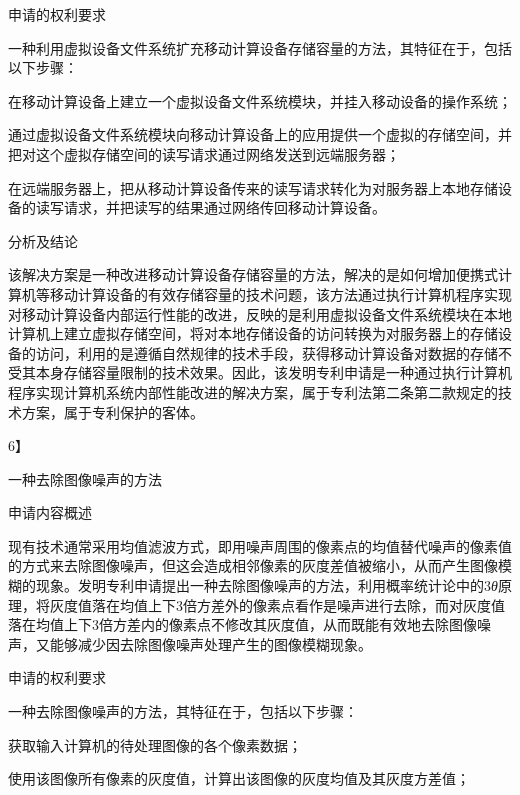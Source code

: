 {\setlength{\parindent}{22.5bp}申请的权利要求\par}

一种利用虚拟设备文件系统扩充移动计算设备存储容量的方法，其特征在于，包括以下步骤：

在移动计算设备上建立一个虚拟设备文件系统模块，并挂入移动设备的操作系统；

通过虚拟设备文件系统模块向移动计算设备上的应用提供一个虚拟的存储空间，并把对这个虚拟存储空间的读写请求通过网络发送到远端服务器；

在远端服务器上，把从移动计算设备传来的读写请求转化为对服务器上本地存储设备的读写请求，并把读写的结果通过网络传回移动计算设备。

{\setlength{\parindent}{22.5bp}分析及结论\par}

该解决方案是一种改进移动计算设备存储容量的方法，解决的是如何增加便携式计算机等移动计算设备的有效存储容量的技术问题，该方法通过执行计算机程序实现对移动计算设备内部运行性能的改进，反映的是利用虚拟设备文件系统模块在本地计算机上建立虚拟存储空间，将对本地存储设备的访问转换为对服务器上的存储设备的访问，利用的是遵循自然规律的技术手段，获得移动计算设备对数据的存储不受其本身存储容量限制的技术效果。因此，该发明专利申请是一种通过执行计算机程序实现计算机系统内部性能改进的解决方案，属于专利法第二条第二款规定的技术方案，属于专利保护的客体。

{6】\par}

一种去除图像噪声的方法

{\setlength{\parindent}{22.5bp}申请内容概述\par}

现有技术通常采用均值滤波方式，即用噪声周围的像素点的均值替代噪声的像素值的方式来去除图像噪声，但这会造成相邻像素的灰度差值被缩小，从而产生图像模糊的现象。发明专利申请提出一种去除图像噪声的方法，利用概率统计论中的3\textit{θ}原理，将灰度值落在均值上下3倍方差外的像素点看作是噪声进行去除，而对灰度值落在均值上下3倍方差内的像素点不修改其灰度值，从而既能有效地去除图像噪声，又能够减少因去除图像噪声处理产生的图像模糊现象。

{\setlength{\parindent}{22.5bp}申请的权利要求\par}

一种去除图像噪声的方法，其特征在于，包括以下步骤：

获取输入计算机的待处理图像的各个像素数据；

使用该图像所有像素的灰度值，计算出该图像的灰度均值及其灰度方差值；

